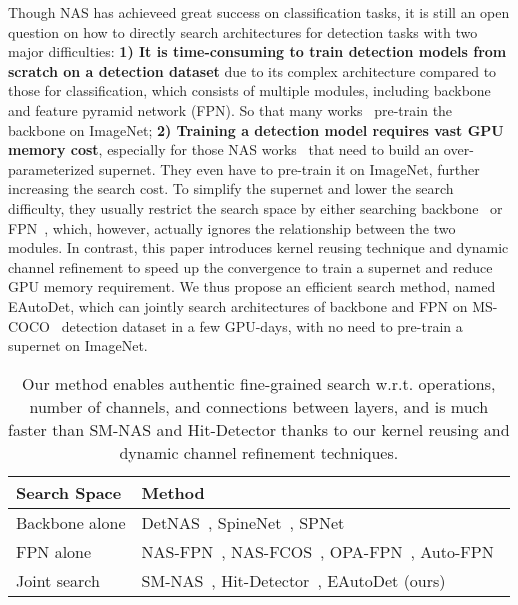 \documentclass[letterpaper]{article} \usepackage{aaai22}  \usepackage{times}  \usepackage{helvet}  \usepackage{courier}  \usepackage[hyphens]{url}  \usepackage{graphicx} \urlstyle{rm} \def\UrlFont{\rm}  \usepackage{natbib}  \usepackage{caption} \DeclareCaptionStyle{ruled}{labelfont=normalfont,labelsep=colon,strut=off} \frenchspacing  \setlength{\pdfpagewidth}{8.5in}  \setlength{\pdfpageheight}{11in}
\begin{document}
Though NAS has achieveed great success on classification tasks, it is still an open question on how to directly search architectures for detection tasks with two major difficulties: \textbf{1) It is time-consuming to train detection models from scratch on a detection dataset} due to its complex architecture compared to those for classification, which consists of multiple modules, including backbone and feature pyramid network (FPN). So that many works~\cite{girshick2015fast,bochkovskiy2020yolov4,liu2016ssd} pre-train the backbone on ImageNet; \textbf{2) Training a detection model requires vast GPU memory cost}, especially for those NAS works~\cite{chen2019detnas,hit_detector} that need to build an over-parameterized supernet. They even have to pre-train it on ImageNet, further increasing the search cost.
To simplify the supernet and lower the search difficulty, they usually restrict the search space by either searching backbone~\cite{chen2019detnas,du2020spinenet,jiang2020sp} or FPN~\cite{ghiasi2019fpn,autofpn,wang2020fcos}, which, however, actually ignores the relationship between the two modules. 
In contrast, this paper introduces kernel reusing technique and dynamic channel refinement to speed up the convergence to train a supernet and reduce GPU memory requirement. We thus propose an efficient search method, named EAutoDet, which can jointly search architectures of backbone and FPN on MS-COCO~\cite{coco} detection dataset in a few GPU-days, with no need to pre-train a supernet on ImageNet.

\begin{table*}[tb!]
    \centering
    \caption{
    Our method enables authentic fine-grained search w.r.t. operations, number of channels, and connections between layers, and is much faster than SM-NAS and Hit-Detector thanks to our kernel reusing and dynamic channel refinement techniques.
}
    \label{tab:comparison_prior_works}
    \vspace{-8pt}
\begin{tabular}{m{70pt}m{400pt}}
    \toprule
    \textbf{Search Space} & \textbf{Method} \\
    \midrule
    Backbone alone& DetNAS~\cite{chen2019detnas}, SpineNet~\cite{du2020spinenet}, SPNet~\cite{jiang2020sp} \\
    \hline
    FPN alone& NAS-FPN~\cite{ghiasi2019fpn}, NAS-FCOS~\cite{wang2020fcos}, OPA-FPN~\cite{liang2021opanas}, Auto-FPN~\cite{autofpn} \\
    \hline
    Joint search & SM-NAS~\cite{yao2020sm}, Hit-Detector~\cite{hit_detector}, EAutoDet (ours) \\
    \bottomrule
    \end{tabular}
\end{table*}
\end{document}
